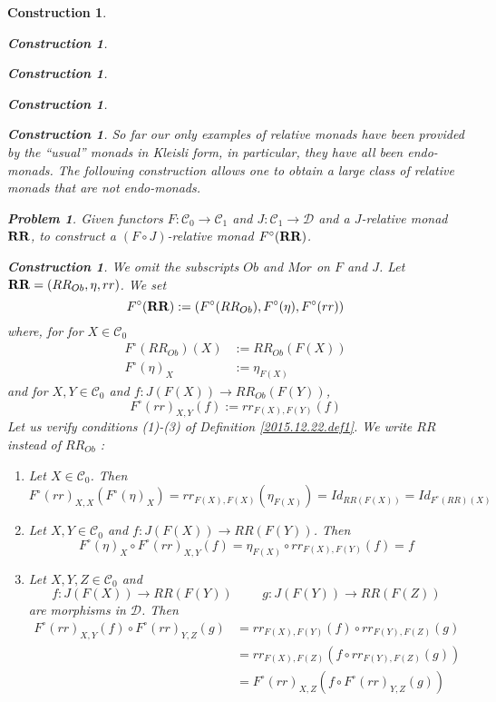 \documentclass[12pt]{amsart}
\numberwithin{proposition}{subsection}
\newtheorem{problem}[proposition]{Problem}
\newtheorem{construction}[proposition]{Construction}
\newcommand{\llabel}[1]{\label{#1}}
\newcommand{\sr}{\rightarrow}
\newcommand{\spc}{{\,\,\,\,\,\,\,}}
\newcommand{\RR}{{\bf RR}}
\newcommand{\C}{{\mathcal C}}
\newcommand{\D}{{\mathcal D}}
\begin{document}
\begin{construction}
\begin{construction}
\begin{construction}
\begin{construction}
\begin{construction}
So far our only examples of relative monads have been provided by the ``usual''
monads in Kleisli form, in particular, they have all been endo-monads.  The
following construction allows one to obtain a large class of relative monads
that are not endo-monads.
%
\begin{problem}\llabel{2017.02.24.prob1}
Given functors $F:\C_0\sr \C_1$ and $J:\C_1\sr\D$ and a $J$-relative monad $\RR$,
to construct a $(F\circ J)$-relative monad $F^{\circ}(\RR)$.
\end{problem}
%
\begin{construction}\llabel{2017.02.24.constr1}\rm
We omit the subscripts $Ob$ and $Mor$ on $F$ and $J$. Let $\RR=(RR_{Ob},\eta,rr)$. We set
%
\begin{equation}
\llabel{2017.04.11.eq3}
F^{\circ}(\RR):=(F^{\circ}(RR_{Ob}), F^{\circ}(\eta), F^{\circ}(rr))
\end{equation}%
%
where, for for $X\in \C_0$
%
\begin{equation}
  \llabel{2017.04.11.eq1}
  \begin{split}
    F^{\circ}(RR_{Ob})(X)&:=RR_{Ob}(F(X))\\
    F^{\circ}(\eta)_X&:=\eta_{F(X)}
  \end{split}
\end{equation}%
%
and for $X,Y\in\C_0$ and $f:J(F(X))\sr RR_{Ob}(F(Y))$,
%
\begin{equation}
\llabel{2017.04.11.eq2}
F^{\circ}(rr)_{X,Y}(f):=rr_{F(X),F(Y)}(f)
\end{equation}%
%
Let us verify conditions (1)-(3) of Definition \ref{2015.12.22.def1}. We write
$RR$ instead of $RR_{Ob}$ :
%
\begin{enumerate}
\item Let $X\in\C_0$. Then 
%
$$F^{\circ}(rr)_{X,X}(F^{\circ}(\eta)_X)=rr_{F(X),F(X)}(\eta_{F(X)})=
Id_{RR(F(X))}=Id_{F^{\circ}(RR)(X)}$$
%
\item Let $X,Y\in \C_0$ and $f:J(F(X))\sr RR(F(Y))$. Then
%
$$F^{\circ}(\eta)_X\circ F^{\circ}(rr)_{X,Y}(f)=\eta_{F(X)}\circ rr_{F(X),F(Y)}(f)=f$$
%
\item Let $X,Y,Z\in \C_0$ and 
%
$$f:J(F(X))\sr RR(F(Y))\spc\spc g:J(F(Y))\sr RR(F(Z))$$
%
are morphisms in $\D$. Then
%
\begin{equation*}
  \begin{split}
    F^{\circ}(rr)_{X,Y}(f)\circ F^{\circ}(rr)_{Y,Z}(g)
      &= rr_{F(X),F(Y)}(f)\circ rr_{F(Y),F(Z)}(g)
    \\&= rr_{F(X),F(Z)}(f\circ rr_{F(Y),F(Z)}(g))
    \\&= F^{\circ}(rr)_{X,Z}(f\circ F^{\circ}(rr)_{Y,Z}(g))

\end{split}
\end{equation*}
\end{enumerate}
\end{construction}
\end{construction}
\end{construction}
\end{construction}
\end{construction}
\end{construction}
\end{document}

